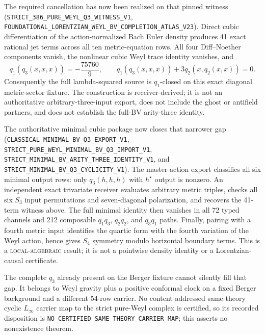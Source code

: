 \documentclass[11pt]{article}
\theoremstyle{definition}
\theoremstyle{remark}
\newcommand{\cert}[1]{\nolinkurl{#1}}
\begin{document}
The required cancellation has now been realized on that pinned witness
(\cert{STRICT_386_PURE_WEYL_Q3_WITNESS_V1},
\cert{FOUNDATIONAL_LORENTZIAN_WEYL_BV_COMPLETION_ATLAS_V23}).  Direct cubic
differentiation of the action-normalized Bach Euler density produces 41 exact
rational jet terms across all ten metric-equation rows.  All four
Diff--Noether components vanish, the nonlinear cubic Weyl trace identity
vanishes, and
\[
 q_1(q_3(x,x,x))=-\frac{75760}{9},\qquad
 q_1(q_3(x,x,x))+3q_2(x,q_2(x,x))=0.
\]
Consequently the full lambda-squared source is $q_1$-closed on this exact
diagonal metric-sector fixture.  The construction is receiver-derived; it is
not an authoritative arbitrary-three-input export, does not include the ghost
or antifield partners, and does not establish the full-BV arity-three identity.

The authoritative minimal cubic package now closes that narrower gap
(\cert{CLASSICAL_MINIMAL_BV_Q3_EXPORT_V1},
\cert{STRICT_PURE_WEYL_MINIMAL_BV_Q3_IMPORT_V1},
\cert{STRICT_MINIMAL_BV_ARITY_THREE_IDENTITY_V1}, and
\cert{STRICT_MINIMAL_BV_Q3_CYCLICITY_V1}).  The master-action export classifies
all six minimal output rows: only $q_3(h,h,h)$ with $h^\star$ output is nonzero.
An independent exact trivariate receiver evaluates arbitrary metric triples,
checks all six $S_3$ input permutations and seven-diagonal polarization, and
recovers the 41-term witness above.  The full minimal identity then vanishes in
all 72 typed channels and 212 composable $q_1q_3$, $q_2q_2$, and $q_3q_1$
paths.  Finally, pairing with a fourth metric input identifies the quartic form
with the fourth variation of the Weyl action, hence gives $S_4$ symmetry modulo
horizontal boundary terms.  This is a \textsc{local-algebraic} result; it is
not a pointwise density identity or a Lorentzian-causal certificate.

The complete $q_3$ already present on the Berger fixture cannot silently fill
that gap.  It belongs to Weyl gravity plus a positive conformal clock on a
fixed Berger background and a different 54-row carrier.  No content-addressed
same-theory cyclic $L_\infty$ carrier map to the strict pure-Weyl complex is
certified, so its recorded disposition is
\cert{NO_CERTIFIED_SAME_THEORY_CARRIER_MAP}; this asserts no nonexistence
theorem.
\end{document}
